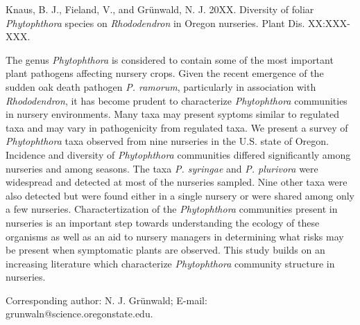 \documentclass[12pt]{article}
\begin{document}
\begin{flushleft}
Knaus, B. J., Fieland, V., and Gr\"{u}nwald, N. J. 20XX. Diversity of foliar \textit{Phytophthora} species on \textit{Rhododendron} in Oregon nurseries. Plant Dis. XX:XXX-XXX.
\\

\hspace{12pt}


\linenumbers


The genus \emph{Phytophthora} is considered to contain some of the most important plant pathogens affecting nursery crops. Given the recent emergence of the sudden oak death pathogen \emph{P. ramorum}, particularly in association with \emph{Rhododendron}, it has become prudent to characterize \emph{Phytophthora} communities in nursery environments.  Many taxa may present syptoms similar to regulated taxa and may vary in pathogenicity from regulated taxa.  We present a survey of \emph{Phytophthora} taxa observed from nine nurseries in the U.S. state of Oregon.  Incidence and diversity of \emph{Phytophthora} communities differed significantly among nurseries and among seasons.  The taxa \emph{P. syringae} and \emph{P. plurivora} were widespread and detected at most of the nurseries sampled.  Nine other taxa were also detected but were found either in a single nursery or were shared among only a few nurseries.  Charactertization of the \emph{Phytophthora} communities present in nurseries is an important step towards understanding the ecology of these organisms as well as an aid to nursery managers in determining what risks may be present when symptomatic plants are observed.  This study builds on an increasing literature which characterize \emph{Phytophthora} community structure in nurseries.


\hspace{12pt}

Corresponding author: N. J. Gr\"{u}nwald; E-mail: grunwaln@science.oregonstate.edu.

\end{flushleft}

\end{document}
